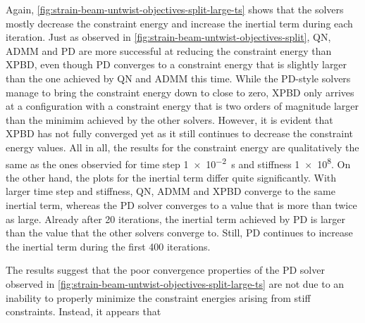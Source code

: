 Again, \autoref{fig:strain-beam-untwist-objectives-split-large-ts} shows that the solvers mostly decrease the constraint energy and increase the inertial term during each 
iteration. Just as observed in \autoref{fig:strain-beam-untwist-objectives-split}, QN, ADMM and PD are more successful at reducing the constraint energy than XPBD, even 
though PD converges to a constraint energy that is slightly larger than the one achieved by QN and ADMM this time. While the PD-style solvers manage to bring the constraint 
energy down to close to zero, XPBD only arrives at a configuration 
with a constraint energy that is two orders of magnitude larger than the minimim achieved by the other solvers. However, it is evident that XPBD has not fully converged yet 
as it still continues to decrease the constraint energy values. All in all, the results for the constraint energy are qualitatively the same as the ones observied for 
time step \SI{1e-2}{\second} and stiffness \num{1e8}. On the other hand, the plots for the inertial term differ quite significantly. With larger time step and stiffness,
QN, ADMM and XPBD converge to the same inertial term, whereas the PD solver converges to a value that is more than twice as large. Already after 20 iterations, the inertial 
term achieved by PD is larger than the value that the other solvers converge to. Still, PD continues to increase the inertial term during the first 400 iterations.

The results suggest that the poor convergence properties of the PD solver observed in \autoref{fig:strain-beam-untwist-objectives-split-large-ts} are not due to an 
inability to properly minimize the constraint energies arising from stiff constraints. Instead, it appears that 

